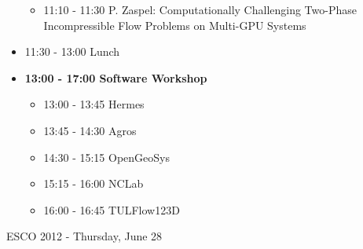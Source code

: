 \documentclass[10pt, A4]{article}%
\begin{document}
\begin{itemize}
\begin{itemize}
    \item 11:10 - 11:30 P. Zaspel: Computationally Challenging Two-Phase Incompressible Flow Problems on Multi-GPU Systems
  \end{itemize}
  \item 11:30 - 13:00 Lunch
  \item {\bf 13:00 - 17:00 Software Workshop}
  \begin{itemize}
    \item 13:00 - 13:45 Hermes 
    \item 13:45 - 14:30 Agros
    \item 14:30 - 15:15 OpenGeoSys
    \item 15:15 - 16:00 NCLab
    \item 16:00 - 16:45 TULFlow123D 
  \end{itemize}
\end{itemize}

\newpage

\centerline{\huge ESCO 2012 - Thursday, June 28}
\vspace{4mm}
\end{document}
